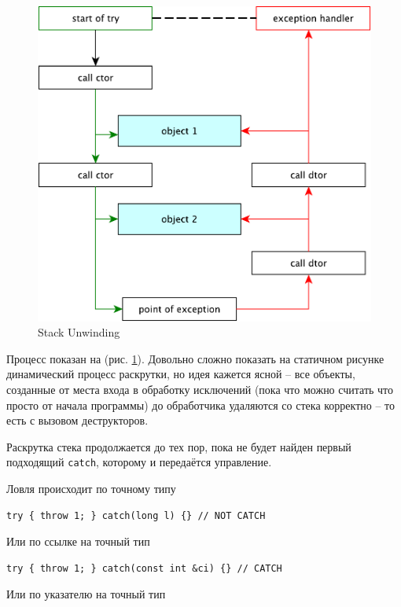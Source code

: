 \documentclass[a4paper,12pt,oneside]{article}
\begin{document}
\begin{figure}[ht]
\centering
\includegraphics[width=1.0\textwidth]{illustrations/stack-unwind-crop.pdf}
\caption{Stack Unwinding}
\label{fig:stack_unwind}
\end{figure}

Процесс показан на (рис. \ref{fig:stack_unwind}). Довольно сложно показать на статичном рисунке динамический процесс раскрутки, но идея кажется ясной -- все объекты, созданные от места входа в обработку исключений (пока что можно считать что просто от начала программы) до обработчика удаляются со стека корректно -- то есть с вызовом деструкторов.

Раскрутка стека продолжается до тех пор, пока не будет найден первый подходящий \lstinline!catch!, которому и передаётся управление.

Ловля происходит по точному типу

\begin{lstlisting}
try { throw 1; } catch(long l) {} // NOT CATCH
\end{lstlisting}

Или по ссылке на точный тип

\begin{lstlisting}
try { throw 1; } catch(const int &ci) {} // CATCH
\end{lstlisting}

Или по указателю на точный тип
\end{document}
